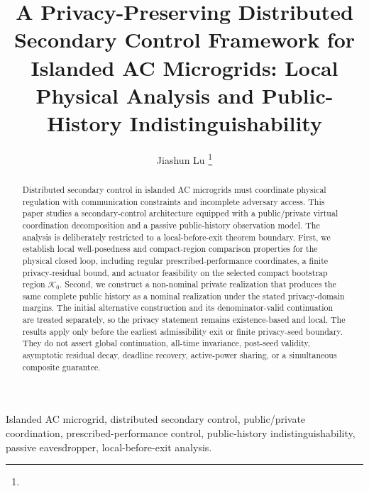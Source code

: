 \documentclass[journal]{IEEEtran}
\begin{document}
\title{A Privacy-Preserving Distributed Secondary Control Framework for Islanded AC Microgrids: Local Physical Analysis and Public-History Indistinguishability}

\author{Jiashun Lu
\thanks
{%
}
}
\maketitle

\begin{abstract}
Distributed secondary control in islanded AC microgrids must coordinate physical regulation with communication constraints and incomplete adversary access. This paper studies a secondary-control architecture equipped with a public/private virtual coordination decomposition and a passive public-history observation model. The analysis is deliberately restricted to a local-before-exit theorem boundary. First, we establish local well-posedness and compact-region comparison properties for the physical closed loop, including regular prescribed-performance coordinates, a finite privacy-residual bound, and actuator feasibility on the selected compact bootstrap region $\mathcal K_0$. Second, we construct a non-nominal private realization that produces the same complete public history as a nominal realization under the stated privacy-domain margins. The initial alternative construction and its denominator-valid continuation are treated separately, so the privacy statement remains existence-based and local. The results apply only before the earliest admissibility exit or finite privacy-seed boundary. They do not assert global continuation, all-time invariance, post-seed validity, asymptotic residual decay, deadline recovery, active-power sharing, or a simultaneous composite guarantee.
\end{abstract}

\begin{IEEEkeywords}
Islanded AC microgrid, distributed secondary control, public/private coordination, prescribed-performance control, public-history indistinguishability, passive eavesdropper, local-before-exit analysis.
\end{IEEEkeywords}
\end{document}
